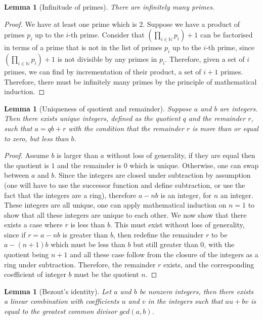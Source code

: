 \documentclass{tufte-book}
\newtheorem{lemma}[theorem]{Lemma}
\begin{document}
\begin{lemma}[Infinitude of primes]
	There are infinitely many primes.
\end{lemma}

\begin{proof}
	We have at least one prime which is $2$.
	Suppose we have a product of primes $p_{i}$ up to the $i$-th prime.
	Consider that $(\prod_{i \in \mathbb{N}} p_i) + 1$ can be factorised in terms
	of a prime that is not in the list of primes $p_{i}$ up to the $i$-th prime, since 
	$(\prod_{i \in \mathbb{N}} p_i) + 1$ is not divisible by any primes in $p_{i}$.
	Therefore, given a set of $i$ primes, we can find by incrementation of their product, a set of $i+1$ primes.
	Therefore, there must be infinitely many primes by the principle of mathematical induction.
\end{proof}

\begin{lemma}[Uniqueness of quotient and remainder]\label{lem:uniqueness-quot}
  Suppose $a$ and $b$ are integers. Then there exists unique integers, defined as the quotient $q$ and the remainder $r$, such that $a = qb + r$ with the condition that the remainder $r$ is more than or equal to zero, but less than $b$.
\end{lemma}

\begin{proof}
  Assume $b$ is larger than $a$ without loss of generality, if they are equal then the quotient is $1$ and the remainder is $0$ which is unique. Otherwise, one can swap between $a$ and $b$.
  Since the integers are closed under subtraction by assumption (one will have to use the successor function and define subtraction, or use the fact that the integers are a ring), therefore $a - nb$ is an integer, for $n$ an integer. These integers are all unique, one can apply mathematical induction on $n = 1$ to show that all these integers are unique to each other. We now show that there exists a case where $r$ is less than $b$. This must exist without loss of generality, since if $r = a - nb$ is greater than $b$, then redefine the remainder $r$ to be $a - (n+1)b$ which must be less than $b$ but still greater than $0$, with the quotient being $n+1$ and all these case follow from the closure of the integers as a ring under subtraction. Therefore, the remainder $r$ exists, and the corresponding coefficient of integer $b$ must be the quotient $n$.
\end{proof}

\begin{lemma}[Bezout's identity]\label{lem:bezout-identity}
  Let $a$ and $b$ be nonzero integers, then there exists a linear combination with coefficients $u$ and $v$ in the integers such that $au + bv$ is equal to the greatest common divisor $gcd(a,b)$.
\end{lemma}
\end{document}
